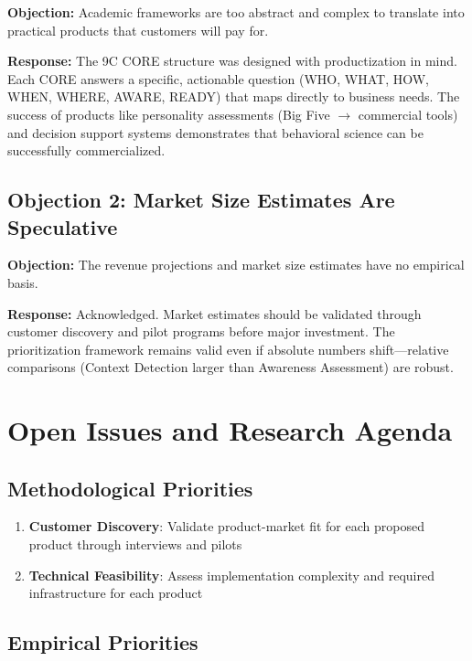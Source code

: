 \textbf{Objection:} Academic frameworks are too abstract and complex to translate into practical products that customers will pay for.

\textbf{Response:} The 9C CORE structure was designed with productization in mind. Each CORE answers a specific, actionable question (WHO, WHAT, HOW, WHEN, WHERE, AWARE, READY) that maps directly to business needs. The success of products like personality assessments (Big Five $\to$ commercial tools) and decision support systems demonstrates that behavioral science can be successfully commercialized.

\subsection{Objection 2: Market Size Estimates Are Speculative}

\textbf{Objection:} The revenue projections and market size estimates have no empirical basis.

\textbf{Response:} Acknowledged. Market estimates should be validated through customer discovery and pilot programs before major investment. The prioritization framework remains valid even if absolute numbers shift---relative comparisons (Context Detection larger than Awareness Assessment) are robust.


\section{Open Issues and Research Agenda}
\label{sec:vvv3-open}

\subsection{Methodological Priorities}

\begin{enumerate}
    \item \textbf{Customer Discovery}: Validate product-market fit for each proposed product through interviews and pilots
    \item \textbf{Technical Feasibility}: Assess implementation complexity and required infrastructure for each product
\end{enumerate}

\subsection{Empirical Priorities}

